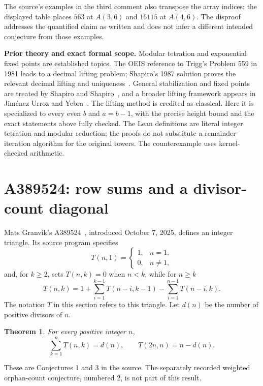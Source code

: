 \documentclass[11pt]{article}
\newtheorem{theorem}{Theorem}[section]
\begin{document}
The source's examples in the third comment also transpose the array
indices: the displayed table places $563$ at $A(3,6)$ and $16115$ at
$A(4,6)$. The disproof addresses the quantified claim as written and
does not infer a different intended conjecture from those examples.

\textbf{Prior theory and exact formal scope.}
Modular tetration and exponential fixed points are established topics.
The OEIS reference to Trigg's Problem 559 in 1981 leads to a decimal
lifting problem; Shapiro's 1987 solution proves the relevant decimal
lifting and uniqueness~\cite{Crux1981,Crux1987}. General stabilization
and fixed points are treated by Shapiro and Shapiro~\cite{Shapiro},
and a broader lifting framework appears in Jim\'enez Urroz and
Yebra~\cite{Yebra}. The lifting method is credited as classical.
Here it is specialized to every even $b$ and $a=b-1$, with the precise
height bound and the exact statements above fully checked.
The Lean definitions are literal integer tetration and modular reduction;
the proofs do not substitute a remainder-iteration algorithm for the
original towers. The counterexample uses kernel-checked arithmetic.

\section{A389524: row sums and a divisor-count diagonal}

Mats Granvik's A389524~\cite{A389524}, introduced October 7, 2025,
defines an integer triangle. Its source program specifies
\[
T(n,1)=\begin{cases}1,&n=1,\\0,&n\ne1,\end{cases}
\]
and, for $k\ge2$, sets $T(n,k)=0$ when $n<k$, while for $n\ge k$
\begin{equation}\label{eq:triangle}
T(n,k)=1+\sum_{i=1}^{k-1}T(n-i,k-1)
          -\sum_{i=1}^{n-1}T(n-i,k).
\end{equation}
The notation $T$ in this section refers to this triangle. Let $d(n)$
be the number of positive divisors of $n$.

\begin{theorem}\label{thm:triangle}
For every positive integer $n$,
\[
\sum_{k=1}^{n}T(n,k)=d(n),\qquad
T(2n,n)=n-d(n).
\]
\end{theorem}

These are Conjectures 1 and 3 in the source. The separately recorded
weighted orphan-count conjecture, numbered 2, is not part of this result.
\end{document}
